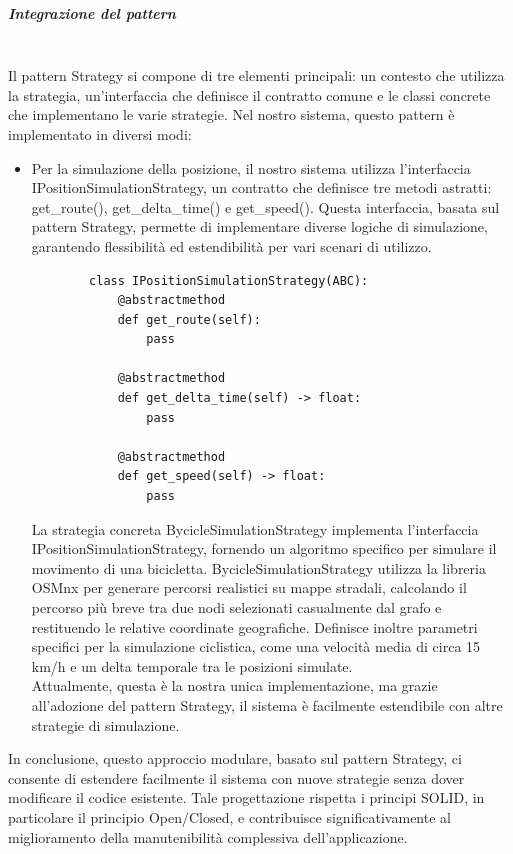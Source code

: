 \documentclass[10pt]{article}
\newcommand{\mysubparagraph}[1]{\subparagraph{#1}\mbox{}\\}
\begin{document}
    \mysubparagraph{Integrazione del pattern}
    Il pattern Strategy si compone di tre elementi principali: un contesto che utilizza la strategia, un'interfaccia che definisce il contratto comune e le classi concrete che implementano le varie strategie. Nel nostro sistema, questo pattern è implementato in diversi modi:
    \begin{itemize}
        \item Per la simulazione della posizione, il nostro sistema utilizza l'interfaccia IPositionSimulationStrategy, un contratto che definisce tre metodi astratti: get\_route(), get\_delta\_time() e get\_speed(). Questa interfaccia, basata sul pattern Strategy, permette di implementare diverse logiche di simulazione, garantendo flessibilità ed estendibilità per vari scenari di utilizzo.
        \begin{lstlisting}
        class IPositionSimulationStrategy(ABC):
            @abstractmethod
            def get_route(self):
                pass

            @abstractmethod
            def get_delta_time(self) -> float:
                pass

            @abstractmethod
            def get_speed(self) -> float:
                pass
        \end{lstlisting}
        La strategia concreta BycicleSimulationStrategy implementa l'interfaccia IPositionSimulationStrategy, fornendo un algoritmo specifico per simulare il movimento di una bicicletta.
        BycicleSimulationStrategy utilizza la libreria OSMnx per generare percorsi realistici su mappe stradali, calcolando il percorso più breve tra due nodi selezionati casualmente dal grafo e restituendo le relative coordinate geografiche. Definisce inoltre parametri specifici per la simulazione ciclistica, come una velocità media di circa 15 km/h e un delta temporale tra le posizioni simulate.\\
        Attualmente, questa è la nostra unica implementazione, ma grazie all'adozione del pattern Strategy, il sistema è facilmente estendibile con altre strategie di simulazione.
        

    \end{itemize}
    In conclusione, questo approccio modulare, basato sul pattern Strategy, ci consente di estendere facilmente il sistema con nuove strategie senza dover modificare il codice esistente. Tale progettazione rispetta i principi SOLID, in particolare il principio Open/Closed, e contribuisce significativamente al miglioramento della manutenibilità complessiva dell'applicazione.
\end{document}
